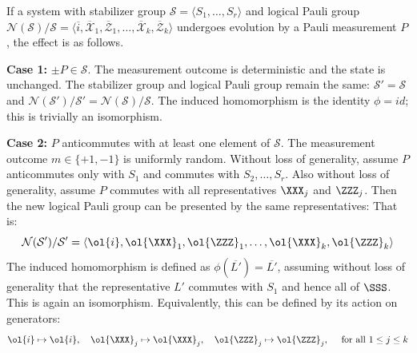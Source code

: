 \begin{theorem}\label{thm:logical_pauli_group_update_measurement}
    If a system with stabilizer group $\mathcal{S} = \langle S_1, \ldots, S_r \rangle$ and logical Pauli group $\mathcal{N}(\mathcal{S})/\mathcal{S} = \langle \overline{i}, \overline{\mathcal{X}}_1, \overline{\mathcal{Z}}_1, \ldots, \overline{\mathcal{X}}_k, \overline{\mathcal{Z}}_k \rangle$ undergoes evolution by a Pauli measurement $P$, the effect is as follows.

    \textbf{Case 1:} $\pm P \in \mathcal{S}$.
    The measurement outcome is deterministic and the state is unchanged.
    The stabilizer group and logical Pauli group remain the same: $\mathcal{S}' = \mathcal{S}$ and $\mathcal{N}(\mathcal{S}')/\mathcal{S}' = \mathcal{N}(\mathcal{S})/\mathcal{S}$.
    The induced homomorphism is the identity $\phi = id$; this is trivially an isomorphism.


    \textbf{Case 2:} $P$ anticommutes with at least one element of $\mathcal{S}$.
    The measurement outcome $m \in \{+1, -1\}$ is uniformly random.
    Without loss of generality, assume $P$ anticommutes only with $S_1$ and commutes with $S_2, \ldots, S_r$.
    Also without loss of generality, assume $P$ commutes with all representatives $\XXX_j$ and $\ZZZ_j$.
    Then the new logical Pauli group can be presented by the same representatives:
    That is:
    \begin{equation}
        \mathcal{N}(\mathcal{S}')/\mathcal{S}' = \langle \ol{i}, \ol{\XXX}_1, \ol{\ZZZ}_1, \ldots, \ol{\XXX}_k, \ol{\ZZZ}_k \rangle
    \end{equation}
    The induced homomorphism is defined as $\phi(\overline{L'}) = \overline{L'}$, assuming without loss of generality that the representative $L'$ commutes with $S_1$ and hence all of $\SSS$.
    This is again an isomorphism.
    Equivalently, this can be defined by its action on generators:
    \begin{equation}
        \ol{i} \mapsto \ol{i}, \quad
        \ol{\XXX}_j \mapsto \ol{\XXX}_j, \quad
        \ol{\ZZZ}_j \mapsto \ol{\ZZZ}_j, \quad
        \text { for all $1 \leq j \leq k$}
    \end{equation}


\end{theorem}
